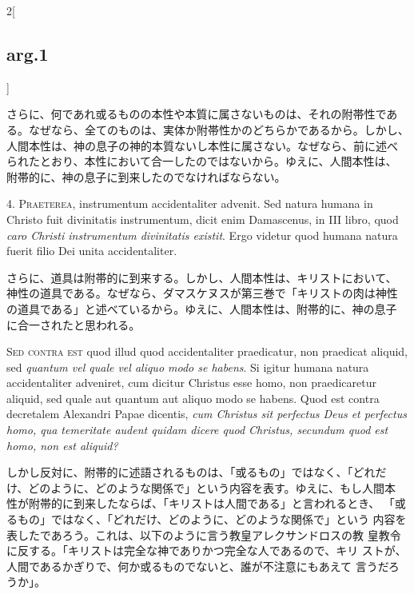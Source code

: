 \documentclass[paper=a4paper,fontsize=10pt,jafontsize=9pt,titlepage]{jlreq}
\begin{document}
\begin{paracol}{2}[\subsection{arg.1}]
\switchcolumn

さらに、何であれ或るものの本性や本質に属さないものは、それの附帯性であ
る。なぜなら、全てのものは、実体か附帯性かのどちらかであるから。しかし、
人間本性は、神の息子の神的本質ないし本性に属さない。なぜなら、前に述べ
られたとおり、本性において合一したのではないから。ゆえに、人間本性は、
附帯的に、神の息子に到来したのでなければならない。


4. {\scshape Praeterea}, instrumentum accidentaliter advenit. Sed
natura humana in Christo fuit divinitatis instrumentum, dicit enim
Damascenus, in III libro, quod {\itshape caro Christi instrumentum
divinitatis existit}. Ergo videtur quod humana natura fuerit filio Dei
unita accidentaliter.

\switchcolumn

さらに、道具は附帯的に到来する。しかし、人間本性は、キリストにおいて、
神性の道具である。なぜなら、ダマスケヌスが第三巻で「キリストの肉は神性
の道具である」と述べているから。ゆえに、人間本性は、附帯的に、神の息子
に合一されたと思われる。

\switchcolumn*[\subsection{s.c.}]

{\scshape Sed contra est} quod illud quod accidentaliter praedicatur,
non praedicat aliquid, sed {\itshape quantum vel quale vel aliquo modo
se habens}. Si igitur humana natura accidentaliter adveniret, cum
dicitur Christus esse homo, non praedicaretur aliquid, sed quale aut
quantum aut aliquo modo se habens. Quod est contra decretalem
Alexandri Papae dicentis, {\itshape cum Christus sit perfectus Deus et
perfectus homo, qua temeritate audent quidam dicere quod Christus,
secundum quod est homo, non est aliquid?}

\switchcolumn

しかし反対に、附帯的に述語されるものは、「或るもの」ではなく、「どれだ
け、どのように、どのような関係で」という内容を表す。ゆえに、もし人間本
性が附帯的に到来したならば、「キリストは人間である」と言われるとき、
「或るもの」ではなく、「どれだけ、どのように、どのような関係で」という
内容を表したであろう。これは、以下のように言う教皇アレクサンドロスの教
皇教令に反する。「キリストは完全な神でありかつ完全な人であるので、キリ
ストが、人間であるかぎりで、何か或るものでないと、誰が不注意にもあえて
言うだろうか」。


\end{paracol}
\end{document}
